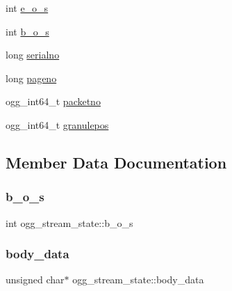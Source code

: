 \begin{DoxyCompactItemize}
int \mbox{\hyperlink{structogg__stream__state_a366e94e72849e0e880d53a22bb9ee646}{e\+\_\+o\+\_\+s}}
\item 
int \mbox{\hyperlink{structogg__stream__state_a76fcc3bf6a59eff87ec3bee1d16fa0b5}{b\+\_\+o\+\_\+s}}
\item 
long \mbox{\hyperlink{structogg__stream__state_a79248e3f1f41cde5331909e8edd98e10}{serialno}}
\item 
long \mbox{\hyperlink{structogg__stream__state_a0ad3315203fcebdc2ccd3b050d28a65c}{pageno}}
\item 
ogg\+\_\+int64\+\_\+t \mbox{\hyperlink{structogg__stream__state_a1bebf380025b6ca0841497e7ab2b5c34}{packetno}}
\item 
ogg\+\_\+int64\+\_\+t \mbox{\hyperlink{structogg__stream__state_a5df750c600660686e29f24b4d1ce836c}{granulepos}}
\end{DoxyCompactItemize}


\subsection{Member Data Documentation}
\mbox{\label{structogg__stream__state_a76fcc3bf6a59eff87ec3bee1d16fa0b5}} 
\subsubsection{\texorpdfstring{b\+\_\+o\+\_\+s}{b\_o\_s}}
{\footnotesize\ttfamily int ogg\+\_\+stream\+\_\+state\+::b\+\_\+o\+\_\+s}

\mbox{\label{structogg__stream__state_a70d03b6f99c1d1e57f55e800b087dae8}} 
\subsubsection{\texorpdfstring{body\+\_\+data}{body\_data}}
{\footnotesize\ttfamily unsigned char$\ast$ ogg\+\_\+stream\+\_\+state\+::body\+\_\+data}

\mbox{\label{structogg__stream__state_a19d45a7b5004f13ae02b5a9502354b93}} 
